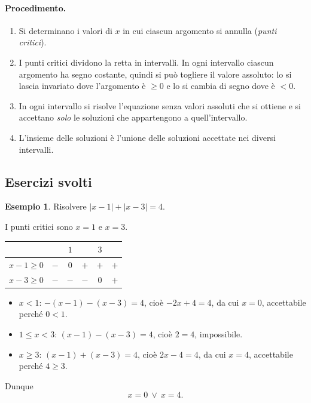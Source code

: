 \documentclass[12pt,a4paper,openany]{book}
\theoremstyle{definition}
\newtheorem{esempio}{Esempio}[section]
\theoremstyle{plain}
\theoremstyle{remark}
\newcommand{\abs}[1]{\left|#1\right|}
\begin{document}
\paragraph{Procedimento.}
\begin{enumerate}[label=\arabic*)]
\item Si determinano i valori di $x$ in cui ciascun argomento si annulla (\emph{punti critici}).
\item I punti critici dividono la retta in intervalli. In ogni intervallo ciascun argomento ha segno costante, quindi si può togliere il valore assoluto: lo si lascia invariato dove l'argomento è $\ge 0$ e lo si cambia di segno dove è $<0$.
\item In ogni intervallo si risolve l'equazione senza valori assoluti che si ottiene e si accettano \emph{solo} le soluzioni che appartengono a quell'intervallo.
\item L'insieme delle soluzioni è l'unione delle soluzioni accettate nei diversi intervalli.
\end{enumerate}

\subsection*{Esercizi svolti}

\begin{esempio}
Risolvere $\abs{x-1}+\abs{x-3}=4$.

I punti critici sono $x=1$ e $x=3$.
\begin{center}
\renewcommand{\arraystretch}{1.3}
\begin{tabular}{l|ccccc}
 & & $1$ & & $3$ & \\
\hline
$x-1\ge 0$ & $-$ & $0$ & $+$ & $+$ & $+$ \\
$x-3\ge 0$ & $-$ & $-$ & $-$ & $0$ & $+$ \\
\end{tabular}
\end{center}
\begin{itemize}
\item $x<1$: $-(x-1)-(x-3)=4$, cioè $-2x+4=4$, da cui $x=0$, accettabile perché $0<1$.
\item $1\le x<3$: $(x-1)-(x-3)=4$, cioè $2=4$, impossibile.
\item $x\ge 3$: $(x-1)+(x-3)=4$, cioè $2x-4=4$, da cui $x=4$, accettabile perché $4\ge 3$.
\end{itemize}
Dunque
\[
x=0\ \lor\ x=4.
\]
\end{esempio}
\end{document}
